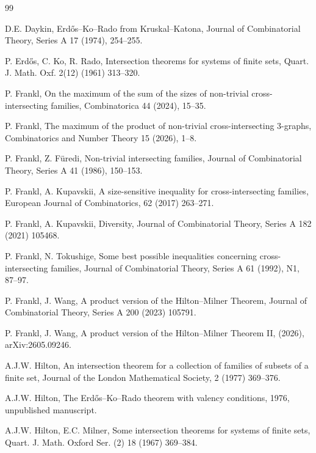 \documentclass[a4paper,11pt]{article}
\begin{document}
\begin{thebibliography}{99}

 D.E. Daykin, 
 Erd\H{o}s--Ko--Rado from Kruskal--Katona,
 Journal of Combinatorial Theory, Series A 17 (1974), 254--255.
 
P. Erd\H{o}s, C. Ko, R. Rado,
Intersection theorems for systems of finite sets,
Quart. J. Math. Oxf. 2(12) (1961) 313--320.


P. Frankl, 
On the maximum of the sum of the sizes of non-trivial cross-intersecting families,
Combinatorica  44 (2024), 15--35.



P. Frankl, 
The maximum of the product of non-trivial cross-intersecting 3-graphs,
Combinatorics and Number Theory 15 (2026), 1--8.


P. Frankl, Z. F\"{u}redi, 
Non-trivial intersecting families, 
Journal of Combinatorial Theory, Series A 41 (1986), 150--153.

P. Frankl, A. Kupavskii, 
A size-sensitive inequality for cross-intersecting families, 
European Journal of Combinatorics, 62 (2017) 263--271.



 P. Frankl, A. Kupavskii, 
 Diversity, 
 Journal of Combinatorial Theory, Series A 182 (2021) 105468.
 
 P. Frankl, N. Tokushige, 
 Some best possible inequalities concerning cross-intersecting families, 
 Journal of Combinatorial Theory, Series A 61 (1992), N1, 87--97.
 

 P. Frankl, J. Wang, 
 A product version of the Hilton--Milner Theorem,
Journal of Combinatorial Theory, Series A  200 (2023) 105791.

P. Frankl, J. Wang, 
A product version of the Hilton--Milner Theorem II, (2026), arXiv:2605.09246. 

A.J.W. Hilton, 
An intersection theorem for a collection of families of subsets of a finite set, 
Journal of the London Mathematical Society, 2 (1977) 369--376.


 A.J.W. Hilton, 
 The Erd\H{o}s--Ko--Rado theorem with valency conditions, 
 1976, unpublished manuscript.
 
A.J.W. Hilton, E.C. Milner,
Some intersection theorems for systems of finite sets,
Quart. J. Math. Oxford Ser. (2) 18 (1967) 369--384.



\end{thebibliography}
\end{document}
